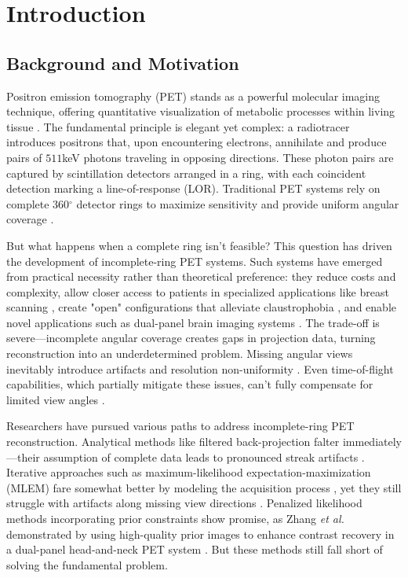 \documentclass[
reprint,
superscriptaddress,
nofootinbib,
amsmath,amssymb,
aps,
prd,
]{revtex4-2}
\begin{document}

\section{Introduction}
\label{chap:introduction}

\subsection{Background and Motivation}

Positron emission tomography (PET) stands as a powerful molecular imaging technique, offering quantitative visualization of metabolic processes within living tissue \cite{townsend2004}. The fundamental principle is elegant yet complex: a radiotracer introduces positrons that, upon encountering electrons, annihilate and produce pairs of $511$keV photons traveling in opposing directions. These photon pairs are captured by scintillation detectors arranged in a ring, with each coincident detection marking a line-of-response (LOR). Traditional PET systems rely on complete 360$^\circ$ detector rings to maximize sensitivity and provide uniform angular coverage \cite{townsend2004}.

But what happens when a complete ring isn't feasible? This question has driven the development of incomplete-ring PET systems. Such systems have emerged from practical necessity rather than theoretical preference: they reduce costs and complexity, allow closer access to patients in specialized applications like breast scanning \cite{surti2008}, create "open" configurations that alleviate claustrophobia \cite{tashima2012, krishnamoorthy2021}, and enable novel applications such as dual-panel brain imaging systems \cite{zhang2020}. The trade-off is severe—incomplete angular coverage creates gaps in projection data, turning reconstruction into an underdetermined problem. Missing angular views inevitably introduce artifacts and resolution non-uniformity \cite{kak1988, surti2008}. Even time-of-flight capabilities, which partially mitigate these issues, can't fully compensate for limited view angles \cite{surti2008, krishnamoorthy2021}.

Researchers have pursued various paths to address incomplete-ring PET reconstruction. Analytical methods like filtered back-projection falter immediately—their assumption of complete data leads to pronounced streak artifacts \cite{kak1988}. Iterative approaches such as maximum-likelihood expectation-maximization (MLEM) fare somewhat better by modeling the acquisition process \cite{qi2006}, yet they still struggle with artifacts along missing view directions \cite{zhang2020}. Penalized likelihood methods incorporating prior constraints show promise, as Zhang \textit{et al.} demonstrated by using high-quality prior images to enhance contrast recovery in a dual-panel head-and-neck PET system \cite{zhang2020}. But these methods still fall short of solving the fundamental problem.
\end{document}

